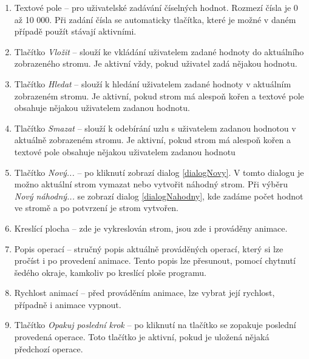 \documentclass[
  biblatex=false,
  font=serif,
  glossaries=false,
  tables=false,
  theorems=false,
  index
]{kidiplom}
\begin{document}
\begin{enumerate}
\item Textové pole -- pro uživatelské zadávání číselných hodnot. Rozmezí čísla je 0 až 10 000. Při zadání čísla se automaticky tlačítka, které je možné v daném případě použít stávají aktivními. 
\item Tlačítko \textit{Vložit} -- slouží ke vkládání uživatelem zadané hodnoty do aktuálního zobrazeného stromu. Je aktivní vždy, pokud uživatel zadá nějakou hodnotu.
\item Tlačítko \textit{Hledat} -- slouží k hledání uživatelem zadané hodnoty v aktuálním zobrazeném stromu. Je aktivní, pokud strom má alespoň kořen a textové pole obsahuje nějakou uživatelem zadanou hodnotu.
\item Tlačítko \textit{Smazat} -- slouží k odebírání uzlu s uživatelem zadanou hodnotou v aktuálně zobrazeném stromu. Je aktivní, pokud strom má alespoň kořen a textové pole obsahuje nějakou uživatelem zadanou hodnotu
\item Tlačítko \textit{Nový...} -- po kliknutí zobrazí dialog \ref{dialogNovy}. V tomto dialogu je možno aktuální strom vymazat nebo vytvořit náhodný strom. Při výběru \textit{Nový náhodný...} se zobrazí dialog \ref{dialogNahodny}, kde zadáme počet hodnot ve stromě a po potvrzení je strom vytvořen.
\item Kreslící plocha -- zde je vykreslován strom, jsou zde i prováděny animace.
\item Popis operací -- stručný popis aktuálně prováděných operací, který si lze pročíst i po provedení animace. Tento popis lze přesunout, pomocí chytnutí šedého okraje, kamkoliv po kreslící ploše programu. 
\item Rychlost animací -- před prováděním animace, lze vybrat její rychlost, případně i animace vypnout. 
\item Tlačítko \textit{Opakuj poslední krok} -- po kliknutí na tlačítko se zopakuje poslední provedená operace. Toto tlačítko je aktivní, pokud je uložená nějaká předchozí operace.
\end{enumerate}
\end{document}
